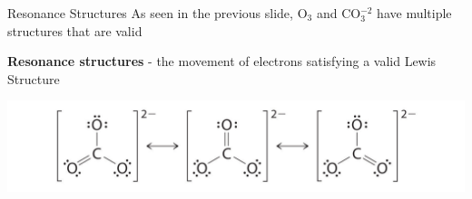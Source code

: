\documentclass[11pt]{beamer}
\begin{document}
\begin{frame}{Resonance Structures}
  As seen in the previous slide, O$_3$ and CO$_3^{-2}$ have multiple
  structures that are valid

  \textbf{Resonance structures} - the movement of electrons satisfying
  a valid Lewis Structure
  
  \centering
  \includegraphics[width=1\linewidth]{resonance_struct}
\end{frame}
\end{document}
